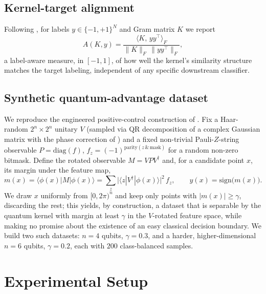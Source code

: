 \documentclass{article}
\begin{document}
\subsection{Kernel-target alignment}

Following \citet{cristianini2001kernel}, for labels $y \in \{-1,+1\}^N$ and
Gram matrix $K$ we report
\[
A(K, y) = \frac{\langle K,\, yy^\top \rangle_F}{\lVert K \rVert_F\,
\lVert yy^\top \rVert_F},
\]
a label-aware measure, in $[-1,1]$, of how well the kernel's similarity
structure matches the target labeling, independent of any specific
downstream classifier.

\subsection{Synthetic quantum-advantage dataset}
\label{sec:synthetic}

We reproduce the engineered positive-control construction of
\citet{havlicek2019supervised}. Fix a Haar-random $2^n \times 2^n$ unitary
$V$ (sampled via QR decomposition of a complex Gaussian matrix with the
phase correction of \citet{mezzadri2007generate}) and a fixed non-trivial
Pauli-$Z$-string observable $P = \mathrm{diag}(f)$, $f_z = (-1)^{\mathrm{parity}(z
\,\&\, \mathrm{mask})}$ for a random non-zero bitmask. Define the rotated
observable $M = V P V^\dagger$ and, for a candidate point $x$, its margin
under the feature map,
\[
m(x) = \langle \phi(x) | M | \phi(x) \rangle
     = \sum_z \big|\langle z | V^\dagger | \phi(x) \rangle\big|^2\, f_z ,
\qquad y(x) = \mathrm{sign}\big(m(x)\big).
\]
We draw $x$ uniformly from $[0, 2\pi)^n$ and keep only points with $|m(x)|
\ge \gamma$, discarding the rest; this yields, by construction, a dataset
that is separable by the quantum kernel with margin at least $\gamma$ in the
$V$-rotated feature space, while making no promise about the existence of an
easy classical decision boundary. We build two such datasets: $n=4$ qubits,
$\gamma=0.3$, and a harder, higher-dimensional $n=6$ qubits, $\gamma=0.2$,
each with $200$ class-balanced samples.

\section{Experimental Setup}
\label{sec:setup}
\end{document}
